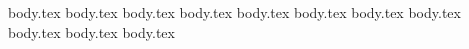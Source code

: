 \chapter{\foursecb{}}
{body.tex}
{body.tex}
{body.tex}
{body.tex}
{body.tex}
{body.tex}
{body.tex}
{body.tex}
{body.tex}
{body.tex}
{body.tex}